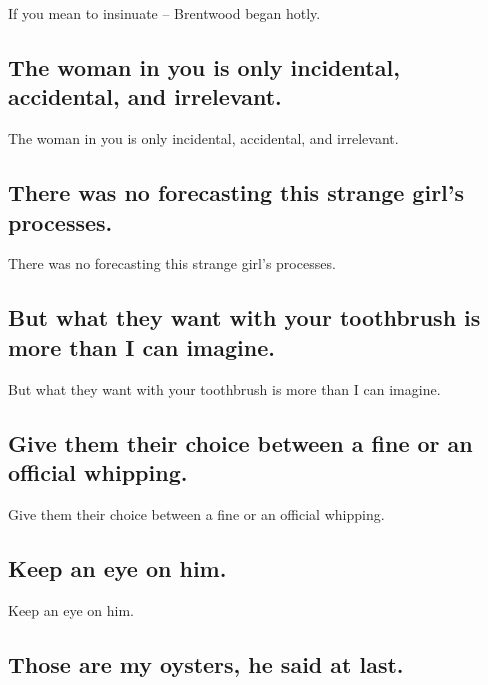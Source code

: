 \documentclass[]{article}
\begin{document}
If you mean to insinuate -- Brentwood began hotly.

\hypertarget{the-woman-in-you-is-only-incidental-accidental-and-irrelevant.}{%
\subsection{The woman in you is only incidental, accidental, and
irrelevant.}\label{the-woman-in-you-is-only-incidental-accidental-and-irrelevant.}}

The woman in you is only incidental, accidental, and irrelevant.

\hypertarget{there-was-no-forecasting-this-strange-girls-processes.}{%
\subsection{There was no forecasting this strange girl's
processes.}\label{there-was-no-forecasting-this-strange-girls-processes.}}

There was no forecasting this strange girl's processes.

\hypertarget{but-what-they-want-with-your-toothbrush-is-more-than-i-can-imagine.}{%
\subsection{But what they want with your toothbrush is more than I can
imagine.}\label{but-what-they-want-with-your-toothbrush-is-more-than-i-can-imagine.}}

But what they want with your toothbrush is more than I can imagine.

\hypertarget{give-them-their-choice-between-a-fine-or-an-official-whipping.}{%
\subsection{Give them their choice between a fine or an official
whipping.}\label{give-them-their-choice-between-a-fine-or-an-official-whipping.}}

Give them their choice between a fine or an official whipping.

\hypertarget{keep-an-eye-on-him.}{%
\subsection{Keep an eye on him.}\label{keep-an-eye-on-him.}}

Keep an eye on him.

\hypertarget{those-are-my-oysters-he-said-at-last.}{%
\subsection{Those are my oysters, he said at
last.}\label{those-are-my-oysters-he-said-at-last.}}
\end{document}
